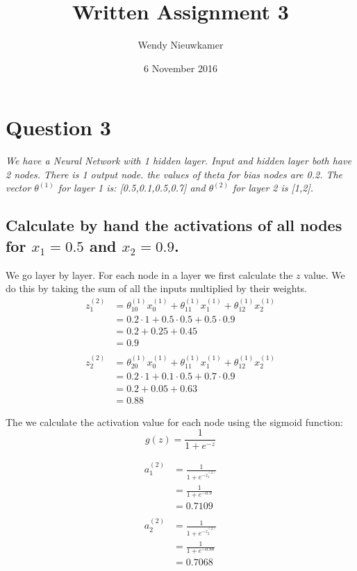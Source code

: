 \documentclass{article}
\title {Written Assignment 3}
\date{6 November 2016}
\author{Wendy Nieuwkamer}
\begin{document}
\maketitle

\section{Question 3}
\textit{We have a Neural Network with 1 hidden layer. Input and hidden layer both have 2 nodes. There is 1 output node. the values of theta for bias nodes are 0.2.
The vector $\theta^{(1)}$ for layer 1 is: [0.5,0.1,0.5,0.7] and $\theta^{(2)}$ for layer 2 is [1,2].}

\subsection{Calculate by hand the activations of all nodes for $x_1 = 0.5$ and $x_2 = 0.9$. }

We go layer by layer. For each node in a layer we first calculate the $z$ value. We do this by taking the sum of all the inputs multiplied by their weights. 
\begin{align*}
z^{(2)}_1 &= \theta_{10}^{(1)}x_0^{(1)} +  \theta_{11}^{(1)}x_1^{(1)} +  \theta_{12}^{(1)}x_2^{(1)} \\
&= 0.2 \cdot 1 + 0.5 \cdot 0.5 + 0.5 \cdot 0.9 \\
&= 0.2 + 0.25 + 0.45 \\
&= 0.9 \\
 \\
z^{(2)}_2 &= \theta_{20}^{(1)}x_0^{(1)} +  \theta_{11}^{(1)}x_1^{(1)} +  \theta_{12}^{(1)}x_2^{(1)} \\
&=0.2 \cdot 1 + 0.1 \cdot 0.5 + 0.7 \cdot 0.9 \\
&= 0.2 + 0.05 + 0.63 \\
&= 0.88
\end{align*}

The we calculate the activation value for each node using the sigmoid function:
\begin{equation*}
g(z) = \frac{1}{1 + e^{-z}}
\end{equation*}

\begin{align*}
a^{(2)}_1 &= \frac{1}{1 + e^{-z^{(2)}_1}} \\
&=  \frac{1}{1 + e^{-0.9}} \\
&= 0.7109 \\
\\
a^{(2)}_2 &= \frac{1}{1 + e^{-z^{(2)}_2}} \\
&=  \frac{1}{1 + e^{-0.88}} \\
&= 0.7068
\end{align*}
\end{document}

